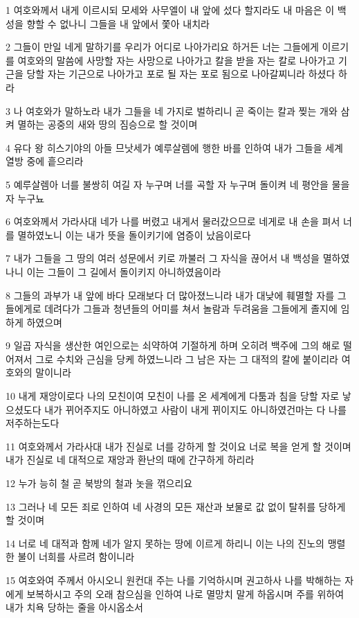 \par 1 여호와께서 내게 이르시되 모세와 사무엘이 내 앞에 섰다 할지라도 내 마음은 이 백성을 향할 수 없나니 그들을 내 앞에서 쫓아 내치라
\par 2 그들이 만일 네게 말하기를 우리가 어디로 나아가리요 하거든 너는 그들에게 이르기를 여호와의 말씀에 사망할 자는 사망으로 나아가고 칼을 받을 자는 칼로 나아가고 기근을 당할 자는 기근으로 나아가고 포로 될 자는 포로 됨으로 나아갈찌니라 하셨다 하라
\par 3 나 여호와가 말하노라 내가 그들을 네 가지로 벌하리니 곧 죽이는 칼과 찢는 개와 삼켜 멸하는 공중의 새와 땅의 짐승으로 할 것이며
\par 4 유다 왕 히스기야의 아들 므낫세가 예루살렘에 행한 바를 인하여 내가 그들을 세계 열방 중에 흩으리라
\par 5 예루살렘아 너를 불쌍히 여길 자 누구며 너를 곡할 자 누구며 돌이켜 네 평안을 물을 자 누구뇨
\par 6 여호와께서 가라사대 네가 나를 버렸고 내게서 물러갔으므로 네게로 내 손을 펴서 너를 멸하였노니 이는 내가 뜻을 돌이키기에 염증이 났음이로다
\par 7 내가 그들을 그 땅의 여러 성문에서 키로 까불러 그 자식을 끊어서 내 백성을 멸하였나니 이는 그들이 그 길에서 돌이키지 아니하였음이라
\par 8 그들의 과부가 내 앞에 바다 모래보다 더 많아졌느니라 내가 대낮에 훼멸할 자를 그들에게로 데려다가 그들과 청년들의 어미를 쳐서 놀람과 두려움을 그들에게 졸지에 임하게 하였으며
\par 9 일곱 자식을 생산한 여인으로는 쇠약하여 기절하게 하며 오히려 백주에 그의 해로 떨어져서 그로 수치와 근심을 당케 하였느니라 그 남은 자는 그 대적의 칼에 붙이리라 여호와의 말이니라
\par 10 내게 재앙이로다 나의 모친이여 모친이 나를 온 세계에게 다툼과 침을 당할 자로 낳으셨도다 내가 뀌어주지도 아니하였고 사람이 내게 뀌이지도 아니하였건마는 다 나를 저주하는도다
\par 11 여호와께서 가라사대 내가 진실로 너를 강하게 할 것이요 너로 복을 얻게 할 것이며 내가 진실로 네 대적으로 재앙과 환난의 때에 간구하게 하리라
\par 12 누가 능히 철 곧 북방의 철과 놋을 꺾으리요
\par 13 그러나 네 모든 죄로 인하여 네 사경의 모든 재산과 보물로 값 없이 탈취를 당하게 할 것이며
\par 14 너로 네 대적과 함께 네가 알지 못하는 땅에 이르게 하리니 이는 나의 진노의 맹렬한 불이 너희를 사르려 함이니라
\par 15 여호와여 주께서 아시오니 원컨대 주는 나를 기억하시며 권고하사 나를 박해하는 자에게 보복하시고 주의 오래 참으심을 인하여 나로 멸망치 말게 하옵시며 주를 위하여 내가 치욕 당하는 줄을 아시옵소서
